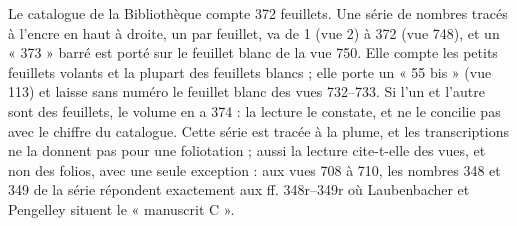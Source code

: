 \documentclass[11pt,a4paper]{article}
\begin{document}
Le catalogue de la Bibliothèque compte 372 feuillets. Une série de nombres tracés à
l'encre en haut à droite, un par feuillet, va de 1 (vue 2) à 372 (vue 748), et un
« 373 » barré est porté sur le feuillet blanc de la vue 750. Elle compte les petits
feuillets volants et la plupart des feuillets blancs ; elle porte un « 55 bis »
(vue 113) et laisse sans numéro le feuillet blanc des vues 732--733. Si l'un et
l'autre sont des feuillets, le volume en a 374 : la lecture le constate, et ne le
concilie pas avec le chiffre du catalogue. Cette série est tracée à la plume, et
les transcriptions ne la donnent pas pour une foliotation ; aussi la lecture
cite-t-elle des vues, et non des folios, avec une seule exception : aux vues 708 à
710, les nombres 348 et 349 de la série répondent exactement aux ff. 348r--349r où
Laubenbacher et Pengelley situent le « manuscrit C ».
\end{document}

